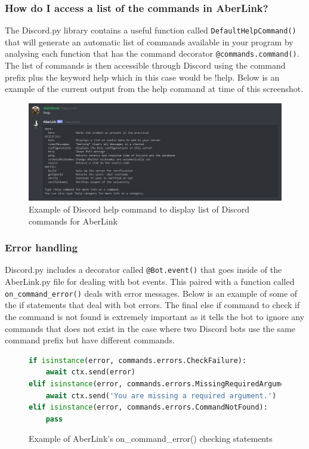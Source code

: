 \subsubsection{How do I access a list of the commands in AberLink?}
The Discord.py library contains a useful function called \verb|DefaultHelpCommand()| that will generate an automatic list of commands available in your program by analysing each function that has the command decorator \verb|@commands.command()|. The list of commands is then accessible through Discord using the command prefix plus the keyword help which in this case would be !help. Below is an example of the current output from the help command at time of this screenshot.  

\begin{figure}[H]
	\centering
	\includegraphics[width=1\linewidth]{Figures/discord-help.png}
	\caption{Example of Discord help command to display list of Discord commands for AberLink}
	\label{fig:discord-help}
\end{figure}

\subsubsection{Error handling}
Discord.py includes a decorator called \verb|@Bot.event()| that goes inside of the AberLink.py file for dealing with bot events. This paired with a function called \verb|on_command_error()| deals with error messages. Below is an example of some of the if statements that deal with bot errors. The final else if command to check if the command is not found is extremely important as it tells the bot to ignore any commands that does not exist in the case where two Discord bots use the same command prefix but have different commands.

\begin{figure}[H]
\begin{lstlisting}[language=Python]
if isinstance(error, commands.errors.CheckFailure):
	await ctx.send(error)
elif isinstance(error, commands.errors.MissingRequiredArgument):
	await ctx.send('You are missing a required argument.')
elif isinstance(error, commands.errors.CommandNotFound):
	pass
\end{lstlisting}
\caption{Example of AberLink's on\_command\_error() checking statements}
\label{fig:discord-error-checking}
\end{figure}

